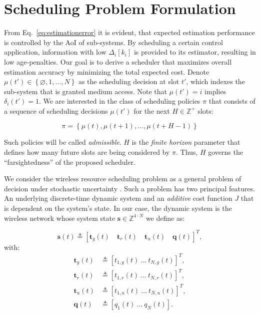 \section{Scheduling Problem Formulation} \label{sec:problem} 

From Eq.~\eqref{eq:estimationerror} it is evident, that expected estimation
performance is controlled by the AoI of sub-systems. By scheduling a certain
control application, information with low $\Delta_i[k_i]$ is provided to its
estimator, resulting in low age-penalties. Our goal is to derive a scheduler
that maximizes overall estimation accuracy by minimizing the total expected
cost. Denote $\mu(t')\in\left\{\varnothing, 1, \dots,N \right\}$ as the
scheduling decision at slot $t'$, which indexes the sub-system that is granted
medium access. Note that $\mu(t')=i$ implies $\delta_i(t')=1$. We are interested
in the class of scheduling policies $\pi$ that consists of a sequence of
scheduling decisions $\mu(t')$ for the next $H \in \mathbb{Z}^+$ slots:

\begin{equation}
  \pi=\left\{ \mu(t), \mu(t+1), \dots, \mu(t+H-1) \right\}
\end{equation}

Such policies will be called \textit{admissible}. $H$ is the \textit{finite
horizon} parameter that defines how many future slots are being considered by
$\pi$. Thus, $H$ governs the ``farsightedness'' of the proposed scheduler.

We consider the wireless resource scheduling problem as a general problem of
decision under stochastic uncertainty \cite{bertsekas1995dynamic}. Such a
problem has two principal features. An underlying discrete-time dynamic system
and an \textit{additive} cost function $J$ that is dependent on the system's
state. In our case, the dynamic system is the wireless network whose system
state $\boldsymbol{s} \in \mathbb{Z}^{4\cdot N}$ we define as:

\begin{equation}
  \boldsymbol{s}(t) \triangleq \left[\boldsymbol{t}_g(t) \quad \boldsymbol{t}_r(t) \quad \boldsymbol{t}_u(t) \quad \boldsymbol{q}(t)\right]^T, 
\end{equation}   
with: 
\begin{align}
  \boldsymbol{t}_g(t) &\triangleq \left[ t_{1,g}(t) ~ \dots ~ t_{N,g}(t) \right]^T ,\\
  \boldsymbol{t}_r(t) &\triangleq \left[ t_{1,r}(t) ~ \dots ~ t_{N,r}(t) \right]^T ,\\
  \boldsymbol{t}_u(t) &\triangleq \left[ t_{1,u}(t) ~ \dots ~ t_{N,u}(t) \right]^T ,\\
  \boldsymbol{q}(t) &\triangleq \left[ q_1(t) ~ \dots ~ q_N(t) \right].
\end{align}  

